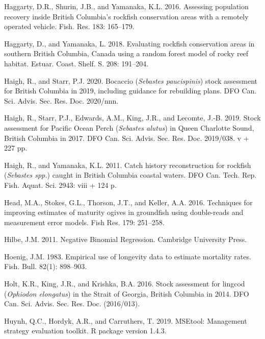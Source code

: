 \documentclass[11pt]{book}
\begin{document}
\leavevmode\hypertarget{ref-haggarty2016b}{}%
Haggarty, D.R., Shurin, J.B., and Yamanaka, K.L. 2016. Assessing population recovery inside British Columbia's rockfish conservation areas with a remotely operated vehicle. Fish. Res. 183: 165--179.

\leavevmode\hypertarget{ref-haggarty2018}{}%
Haggarty, D., and Yamanaka, L. 2018. Evaluating rockfish conservation areas in southern British Columbia, Canada using a random forest model of rocky reef habitat. Estuar. Coast. Shelf. S. 208: 191--204.

\leavevmode\hypertarget{ref-haigh2020}{}%
Haigh, R., and Starr, P.J. 2020. Bocaccio (\emph{Sebastes paucispinis}) stock assessment for British Columbia in 2019, including guidance for rebuilding plans. DFO Can. Sci. Advis. Sec. Res. Doc. 2020/nnn.

\leavevmode\hypertarget{ref-haigh2019}{}%
Haigh, R., Starr, P.J., Edwards, A.M., King, J.R., and Lecomte, J.-B. 2019. Stock assessment for Pacific Ocean Perch (\emph{Sebastes alutus}) in Queen Charlotte Sound, British Columbia in 2017. DFO Can. Sci. Advis. Sec. Res. Doc. 2019/038. v + 227 pp.

\leavevmode\hypertarget{ref-haigh2011}{}%
Haigh, R., and Yamanaka, K.L. 2011. Catch history reconstruction for rockfish (\emph{Sebastes spp.}) caught in British Columbia coastal waters. DFO Can. Tech. Rep. Fish. Aquat. Sci. 2943: viii + 124 p.

\leavevmode\hypertarget{ref-head2016}{}%
Head, M.A., Stokes, G.L., Thorson, J.T., and Keller, A.A. 2016. Techniques for improving estimates of maturity ogives in groundfish using double-reads and measurement error models. Fish Res. 179: 251--258.

\leavevmode\hypertarget{ref-hilbe2011}{}%
Hilbe, J.M. 2011. Negative Binomial Regression. Cambridge University Press.

\leavevmode\hypertarget{ref-hoenig1983}{}%
Hoenig, J.M. 1983. Empirical use of longevity data to estimate mortality rates. Fish. Bull. 82(1): 898--903.

\leavevmode\hypertarget{ref-holt2016}{}%
Holt, K.R., King, J.R., and Krishka, B.A. 2016. Stock assessment for lingcod (\emph{Ophiodon elongatus}) in the Strait of Georgia, British Columbia in 2014. DFO Can. Sci. Advis. Sec. Res. Doc. (2016/013).

\leavevmode\hypertarget{ref-huynh_msetool_2019}{}%
Huynh, Q.C., Hordyk, A.R., and Carruthers, T. 2019. MSEtool: Management strategy evaluation toolkit. R package version 1.4.3.
\end{document}
